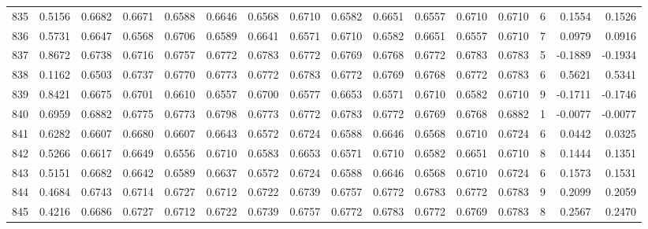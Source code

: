 \begin{tabular}{lrrrrrrrrrrrrrrr}
835 &      0.5156 &  0.6682 &  0.6671 &  0.6588 &  0.6646 &  0.6568 &  0.6710 &  0.6582 &  0.6651 &  0.6557 &   0.6710 &     0.6710 &      6 &                    0.1554 &                     0.1526 \\
836 &      0.5731 &  0.6647 &  0.6568 &  0.6706 &  0.6589 &  0.6641 &  0.6571 &  0.6710 &  0.6582 &  0.6651 &   0.6557 &     0.6710 &      7 &                    0.0979 &                     0.0916 \\
837 &      0.8672 &  0.6738 &  0.6716 &  0.6757 &  0.6772 &  0.6783 &  0.6772 &  0.6769 &  0.6768 &  0.6772 &   0.6783 &     0.6783 &      5 &                   -0.1889 &                    -0.1934 \\
838 &      0.1162 &  0.6503 &  0.6737 &  0.6770 &  0.6773 &  0.6772 &  0.6783 &  0.6772 &  0.6769 &  0.6768 &   0.6772 &     0.6783 &      6 &                    0.5621 &                     0.5341 \\
839 &      0.8421 &  0.6675 &  0.6701 &  0.6610 &  0.6557 &  0.6700 &  0.6577 &  0.6653 &  0.6571 &  0.6710 &   0.6582 &     0.6710 &      9 &                   -0.1711 &                    -0.1746 \\
840 &      0.6959 &  0.6882 &  0.6775 &  0.6773 &  0.6798 &  0.6773 &  0.6772 &  0.6783 &  0.6772 &  0.6769 &   0.6768 &     0.6882 &      1 &                   -0.0077 &                    -0.0077 \\
841 &      0.6282 &  0.6607 &  0.6680 &  0.6607 &  0.6643 &  0.6572 &  0.6724 &  0.6588 &  0.6646 &  0.6568 &   0.6710 &     0.6724 &      6 &                    0.0442 &                     0.0325 \\
842 &      0.5266 &  0.6617 &  0.6649 &  0.6556 &  0.6710 &  0.6583 &  0.6653 &  0.6571 &  0.6710 &  0.6582 &   0.6651 &     0.6710 &      8 &                    0.1444 &                     0.1351 \\
843 &      0.5151 &  0.6682 &  0.6642 &  0.6589 &  0.6637 &  0.6572 &  0.6724 &  0.6588 &  0.6646 &  0.6568 &   0.6710 &     0.6724 &      6 &                    0.1573 &                     0.1531 \\
844 &      0.4684 &  0.6743 &  0.6714 &  0.6727 &  0.6712 &  0.6722 &  0.6739 &  0.6757 &  0.6772 &  0.6783 &   0.6772 &     0.6783 &      9 &                    0.2099 &                     0.2059 \\
845 &      0.4216 &  0.6686 &  0.6727 &  0.6712 &  0.6722 &  0.6739 &  0.6757 &  0.6772 &  0.6783 &  0.6772 &   0.6769 &     0.6783 &      8 &                    0.2567 &                     0.2470 \\

\end{tabular}
